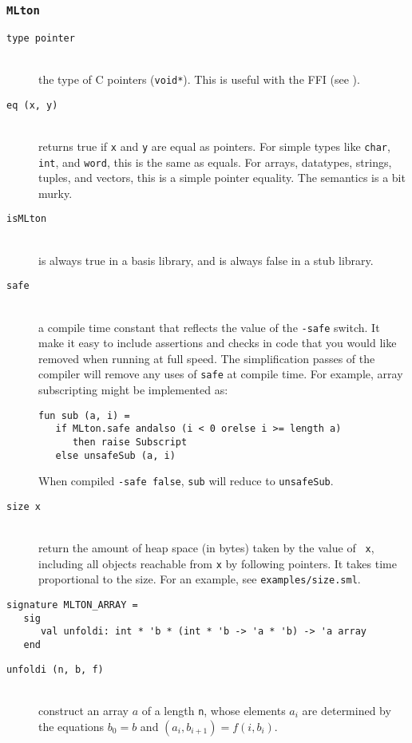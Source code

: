 \subsubsection{{\tt MLton}}

\newcommand{\entry}[1]{\item[\tt #1]\hspace{1in}\\}
\begin{description}

\entry{type pointer}
the type of C pointers ({\tt void*}).  This is useful with the FFI
(see ).

\entry{eq (x, y)}
returns true if {\tt x} and {\tt y} are equal as pointers.  For simple types
like {\tt char}, {\tt int}, and {\tt word}, this is the same as equals.  For
arrays, datatypes, strings, tuples, and vectors, this is a simple pointer
equality.  The semantics is a bit murky.

\entry{isMLton}
is always true in a {\mlton} basis library, and is always false in a stub
library.

\entry{safe}
a compile time constant that reflects the value of the {\tt -safe} switch.  It
make it easy to include assertions and checks in code that you would like
removed when running at full speed. The simplification passes of the compiler
will remove any uses of {\tt safe} at compile time.  For example, array
subscripting might be implemented as:
\begin{verbatim}
fun sub (a, i) =
   if MLton.safe andalso (i < 0 orelse i >= length a)
      then raise Subscript
   else unsafeSub (a, i)
\end{verbatim}
When compiled {\tt -safe false}, {\tt sub} will reduce to
{\tt unsafeSub}.

\entry{size x}
return the amount of heap space (in bytes) taken by the value of {\tt
x}, including all objects reachable from {\tt x} by following
pointers.  It takes time proportional to the size.  For an example,
see {\tt examples/size.sml}.

\end{description}


\begin{verbatim}
signature MLTON_ARRAY =
   sig
      val unfoldi: int * 'b * (int * 'b -> 'a * 'b) -> 'a array
   end
\end{verbatim}

\begin{description}

\entry{unfoldi (n, b, f)}
construct an array $a$ of a length {\tt n}, whose elements $a_i$ are determined
by the equations $b_0 = b$ and $(a_i, b_{i+1}) = f (i, b_i)$.

\end{description}
%
